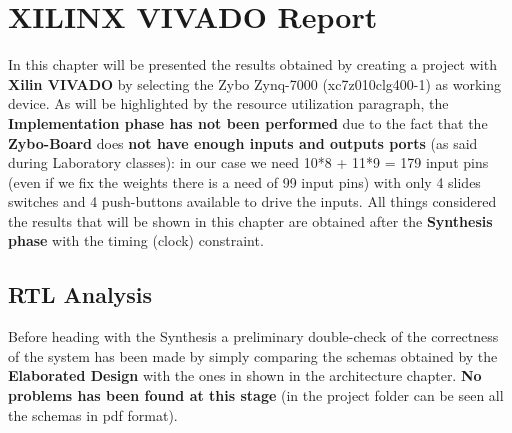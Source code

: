 \section{XILINX VIVADO Report}
In this chapter will be presented the results obtained by creating a project with \textbf{Xilin VIVADO} by selecting the Zybo Zynq-7000 (xc7z010clg400-1) as working device. As will be highlighted by the resource utilization paragraph, the \textbf{Implementation phase has not been performed} due to the fact that the \textbf{Zybo-Board} does \textbf{not have enough inputs and outputs ports} (as said during Laboratory classes): in our case we need 10*8 + 11*9 = 179 input pins (even if we fix the weights there is a need of 99 input pins) with only 4 slides switches and 4 push-buttons available to drive the inputs. All things considered the results that will be shown in this chapter are obtained after the \textbf{Synthesis phase} with the timing (clock) constraint.

\subsection{RTL Analysis}
Before heading with the Synthesis a preliminary double-check of the correctness of the system has been made by simply comparing the schemas obtained by the \textbf{Elaborated Design} with the ones in shown in the architecture chapter.\textbf{ No problems has been found at this stage} (in the project folder can be seen all the schemas in pdf format).
